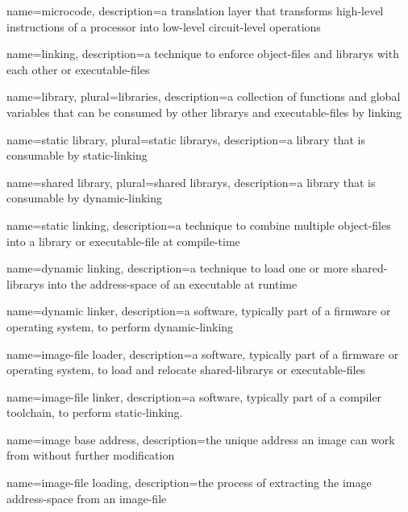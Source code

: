 {
  name={microcode},
  description={a translation layer that transforms high-level instructions of a processor into low-level circuit-level operations}
}

{
  name={linking},
  description={a technique to enforce \glspl{object-file} and \glspl{library}} with each other or \glspl{executable-file}
}

{
  name={library},
  plural={libraries},
  description={a collection of functions and global variables that can be consumed by other \glspl{library} and \glspl{executable-file} by \gls{linking}}
}

{
  name={static \gls{library}},
  plural={static \glspl{library}},
  description={a \gls{library} that is consumable by \gls{static-linking}}
}

{
  name={shared \gls{library}},
  plural={shared \glspl{library}},
  description={a \gls{library} that is consumable by \gls{dynamic-linking}}
}

{
  name={static \gls{linking}},
  description={a technique to combine multiple \glspl{object-file} into a \gls{library} or \gls{executable-file} at compile-time}
}

{
  name={dynamic \gls{linking}},
  description={a technique to load one or more \glspl{shared-library} into the \gls{address-space} of an executable at runtime}
}

{
  name={dynamic linker},
  description={a software, typically part of a \gls{firmware} or operating system, to perform \gls{dynamic-linking}}
}

{
  name={\gls{image-file} loader},
  description={a software, typically part of a \gls{firmware} or operating system, to load and relocate \glspl{shared-library} or \glspl{executable-file}}
}

{
  name={\gls{image-file} linker},
  description={a software, typically part of a compiler toolchain, to perform \gls{static-linking}.}
}

{
  name={\gls{image} base address},
  description={the unique address an \gls{image} can work from without further modification}
}

{
  name={\gls{image-file} loading},
  description={the process of extracting the \gls{image} \gls{address-space} from an \gls{image-file}}
}

